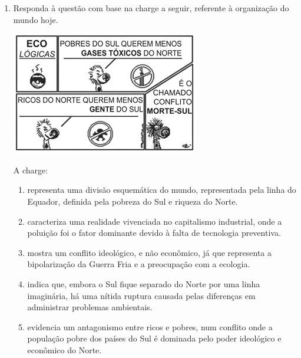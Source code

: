 \documentclass[10pt,a4paper]{article}
\newenvironment{Figure}
  {\par\medskip\noindent\minipage{\linewidth}}
  {\endminipage\par\medskip}
\begin{document}
\begin{multicols}{2}
\begin{enumerate}
		\begin{enumerate}
		\item  a marcha da industrializa\c{c}\~ao brasileira.
		\item o  fluxo de migra\c{c}\~oes no s\'eculo XX.
		\item o extrativismo mineral.
		\item as frentes pioneiras da agricultura brasileira.
		\item a nova expans\~ao industrial do s\'eculo XX.
		\end{enumerate}
	\item Responda \`a quest\~ao com base na charge a seguir, referente \`a organiza\c{c}\~ao do mundo hoje.

\begin{Figure}
     \includegraphics[width=\linewidth]{norte_sul_geografia.jpg}
\end{Figure}
		A charge:

		\begin{enumerate}
		\item representa uma divis\~ao esquem\'atica do mundo, representada pela linha do Equador, definida pela pobreza do Sul e riqueza do Norte.
		\item caracteriza uma realidade vivenciada no capitalismo industrial, onde a polui\c{c}\~ao foi o fator dominante devido \`a falta de tecnologia preventiva.
		\item mostra um conflito ideol\'ogico, e n\~ao econ\^omico, j\'a que representa a bipolariza\c{c}\~ao da Guerra Fria e a preocupa\c{c}\~ao com a ecologia.
		\item indica que, embora o Sul fique separado do Norte por uma linha imagin\'aria, h\'a uma n\'itida ruptura causada pelas diferen\c{c}as em administrar problemas ambientais.
		\item evidencia um antagonismo entre ricos e pobres, num conflito onde a popula\c{c}\~ao pobre dos pa\'ises do Sul \'e dominada pelo poder ideol\'ogico e econ\^omico do Norte.
		\end{enumerate}


\end{enumerate}
\end{multicols}
\end{document}
